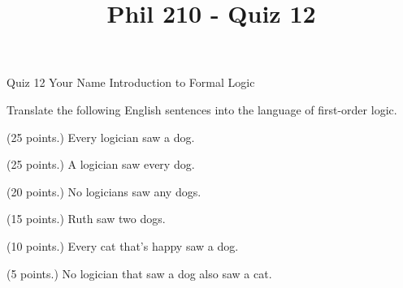 
\title{Phil 210 - Quiz 12}

\heading
Quiz 12
Your Name
Introduction to Formal Logic
\endheading

Translate the following English sentences into the language of first-order logic.

\quantifiers
\problems
{} (25 points.)
Every logician saw a dog.
        \answer
        $ $
        \endanswer

 (25 points.)
A logician saw every dog.
        \answer
        $ $
        \endanswer

 (20 points.)
No logicians saw any dogs.
        \answer
        $ $
        \endanswer

 (15 points.)
Ruth saw two dogs.
        \answer
        $ $
        \endanswer

 (10 points.)
Every cat that's happy saw a dog.
        \answer
        $ $
        \endanswer

 (5 points.)
No logician that saw a dog also saw a cat.
        \answer
        $ $
        \endanswer

\endproblems
\bye
